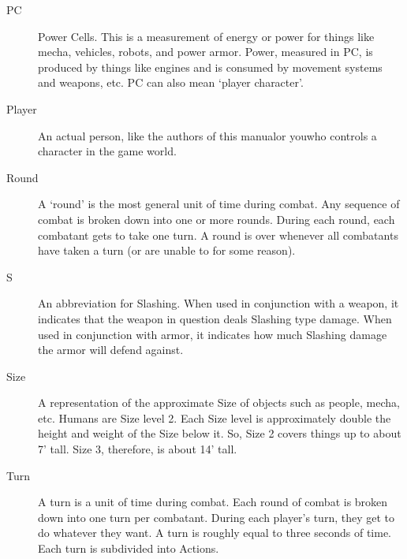\documentclass[twoside]{book}
\begin{document}
\begin{description}
  \item[ PC ] 
    {  
     Power Cells. This is a measurement of energy or
                 power for things like mecha, vehicles, robots, and power
                 armor. Power, measured in PC, is produced by things like
                 engines and is consumed by movement systems and weapons,
                 etc. PC can also mean `player character'.
                 
    }
  
  \item[ Player ] 
    {  
     An actual person, like the authors of this
                 manualor youwho controls a character in
                 the game world. 
    }
  
  \item[ Round ] 
    {  
     A `round' is the most general unit of
                 time during combat. Any sequence of combat is broken
                 down into one or more rounds. During each round, each
                 combatant gets to take one turn. A round is over
                 whenever all combatants have taken a turn (or are unable
                 to for some reason). 
    }
  
  \item[ S ] 
    {  
     An abbreviation for Slashing. When used in
                 conjunction with a weapon, it indicates that the weapon
                 in question deals Slashing type damage. When used in
                 conjunction with armor, it indicates how much Slashing
                 damage the armor will defend against. 
    }
  
  \item[ Size ] 
    {  
     A representation of the approximate Size of
                 objects such as people, mecha, etc. Humans are Size
                 level 2. Each Size level is approximately double the
                 height and weight of the Size below it. So, Size 2
                 covers things up to about 7' tall. Size 3,
                 therefore, is about 14' tall. 
    }
  
  \item[ Turn ] 
    {  
     A turn is a unit of time during combat. Each
                 round of combat is broken down into one turn per
                 combatant. During each player's turn, they get to
                 do whatever they want. A turn is roughly equal to three
                 seconds of time. Each turn is subdivided into Actions.
                 
    }
  

\end{description}
\end{document}
